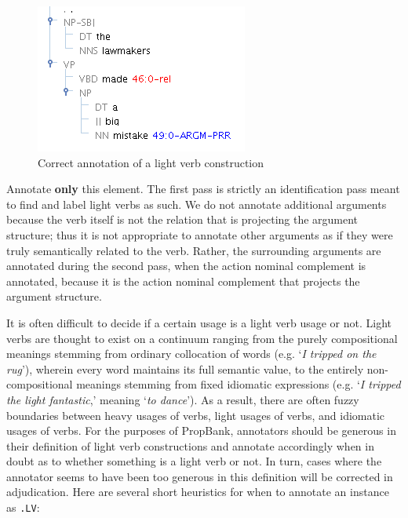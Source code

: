\documentclass[11pt]{report}
\begin{document}
\begin{figure}[htbp]
\centering
\includegraphics[scale=0.5]{img/LightVerbAnnots.png}
\caption{Correct annotation of a light verb construction}
\label{fig: LightVerbAnnots}
\end{figure}

Annotate \textbf{only} this element.  The first pass is strictly an identification pass meant to find and label light verbs as such.  We do not annotate additional arguments because the verb itself is not the relation that is projecting the argument structure; thus it is not appropriate to annotate other arguments as if they were truly semantically related to the verb.  Rather, the surrounding arguments are annotated during the second pass, when the action nominal complement is annotated, because it is the action nominal complement that projects the argument structure.  

It is often difficult to decide if a certain usage is a light verb usage or not.  Light verbs are thought to exist on a continuum ranging from the purely compositional meanings stemming from ordinary collocation of words (e.g. `\textit{I tripped on the rug}'), wherein every word maintains its full semantic value, to the entirely non-compositional meanings stemming from fixed idiomatic expressions (e.g. `\textit{I tripped the light fantastic},' meaning `\textit{to dance}').  As a result, there are often fuzzy boundaries between heavy usages of verbs, light usages of verbs, and idiomatic usages of verbs.  For the purposes of PropBank, annotators should be generous in their definition of light verb constructions and annotate accordingly when in doubt as to whether something is a light verb or not.  In turn, cases where the annotator seems to have been too generous in this definition will be corrected in adjudication. Here are several short heuristics for when to annotate an instance as \texttt{.LV}: 
\end{document}
